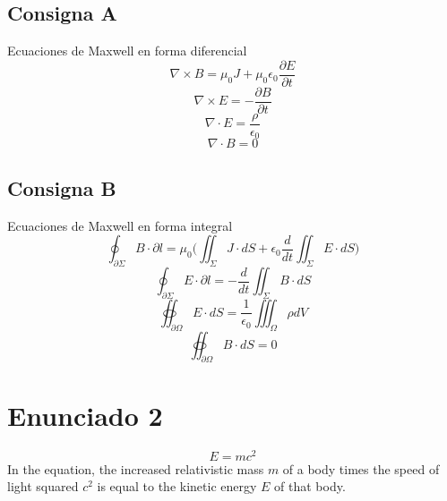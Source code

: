 \documentclass[a4paper, 12pt]{article}
\begin{document}
\subsection{Consigna A}
Ecuaciones de Maxwell en forma diferencial
\begin{equation}
	\nabla\times B=\mu_{0} J+\mu_{0}\epsilon_{0}\frac{\partial E}{\partial t}
\end{equation}
\begin{equation}
	\nabla\times E=-\frac{\partial B}{\partial t}
\end{equation}
\begin{equation}
	\nabla\cdot E=\frac{\rho}{\epsilon_{0}}
\end{equation}
\begin{equation}
	\nabla\cdot B=0
\end{equation}
\subsection{Consigna B}
Ecuaciones de Maxwell en forma integral
\begin{equation}
	\oint_{\partial\Sigma}{B\cdot\partial l}=\mu_{0}\Big(\iint_{\Sigma}{J\cdot dS}+\epsilon_{0}\frac{d}{dt}\iint_{\Sigma}{E\cdot dS}\Big)
\end{equation}
\begin{equation}
	\oint_{\partial\Sigma}{E\cdot\partial l}=-\frac{d}{dt}\iint_{\Sigma}{B\cdot dS}
\end{equation}
\begin{equation}
	\oiint_{\partial\Omega}{E\cdot dS}=\frac{1}{\epsilon_{0}}\iiint_{\Omega}{\rho dV}
\end{equation}
\begin{equation}
	\oiint_{\partial\Omega}{B\cdot dS}=0
\end{equation}
\section{Enunciado 2}
\begin{equation}
	E=mc^2
\end{equation}
In the equation, the increased relativistic mass $m$ of a body times the speed of light squared $c^2$ is equal to the kinetic energy $E$ of that body.
\newpage
\end{document}
